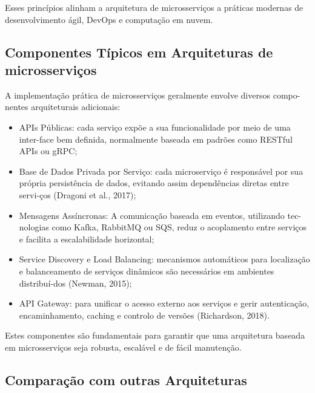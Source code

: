 Esses princípios alinham a arquitetura de microsserviços a práticas modernas de desenvolvimento ágil, DevOps e computação em nuvem.

\subsection{Componentes Típicos em Arquiteturas de microsserviços}

A implementação prática de microsserviços geralmente envolve diversos compo-nentes arquiteturais adicionais:

\begin{itemize}
    \item APIs Públicas: cada serviço expõe a sua funcionalidade por meio de uma inter-face bem definida, normalmente baseada em padrões como RESTful APIs ou gRPC;
    \item Base de Dados Privada por Serviço: cada microserviço é responsável por sua própria persistência de dados, evitando assim dependências diretas entre servi-ços (Dragoni et al., 2017);
    \item Mensagens Assíncronas: A comunicação baseada em eventos, utilizando tec-nologias como Kafka, RabbitMQ ou SQS, reduz o acoplamento entre serviços e facilita a escalabilidade horizontal;
    \item Service Discovery e Load Balancing: mecanismos automáticos para localização e balanceamento de serviços dinâmicos são necessários em ambientes distribuí-dos (Newman, 2015);
    \item API Gateway: para unificar o acesso externo aos serviços e gerir autenticação, encaminhamento, caching e controlo de versões (Richardson, 2018).
\end{itemize}

Estes componentes são fundamentais para garantir que uma arquitetura baseada em microsserviços seja robusta, escalável e de fácil manutenção.

\subsection{Comparação com outras Arquiteturas}

